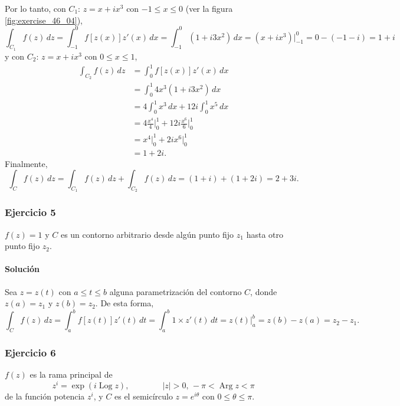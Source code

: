 \documentclass[a4paper]{report}
\DeclareMathOperator{\Arg}{Arg}
\DeclareMathOperator{\Log}{Log}
\begin{document}
Por lo tanto, con \(C_1:\,z=x+ix^3\) con \(-1\leq x\leq0\) (ver la figura \ref{fig:exercise_46_04}),
\[
 \int_{C_1}f(z)\,dz=\int_{-1}^{0}f[z(x)]z'(x)\,dx=\int_{-1}^{0}(1+i3x^2)\,dx=(x+ix^3)\bigg|_{-1}^{0}=0-(-1-i)=1+i
\]
y con \(C_2:\,z=x+ix^3\) con \(0\leq x\leq1\),
\begin{align*}
 \int_{C_2}f(z)\,dz&=\int_{0}^{1}f[z(x)]z'(x)\,dx\\
   &=\int_{0}^{1}4x^3(1+i3x^2)\,dx\\ 
   &=4\int_{0}^{1}x^3\,dx+12i\int_{0}^{1}x^5\,dx\\
   &=4\frac{x^4}{4}\bigg|_{0}^{1}+12i\frac{x^6}{6}\bigg|_{0}^{1}\\
   &=x^4\bigg|_{0}^{1}+2ix^6\bigg|_{0}^{1}\\
   &=1+2i.
\end{align*}
Finalmente,
\[
 \int_C f(z)\,dz=\int_{C_1}f(z)\,dz+\int_{C_2}f(z)\,dz=(1+i)+(1+2i)=2+3i.
\]

\subsubsection{Ejercicio 5}

\(f(z)=1\) y \(C\) es un contorno arbitrario desde algún punto fijo \(z_1\) hasta otro punto fijo \(z_2\).

\paragraph{Solución} Sea \(z=z(t)\) con \(a\leq t\leq b\) alguna parametrización del contorno \(C\), donde \(z(a)=z_1\) y \(z(b)=z_2\). De esta forma,
\[
 \int_Cf(z)\,dz=\int_a^bf[z(t)]z'(t)\,dt=\int_a^b1\times z'(t)\,dt=z(t)\bigg|_a^b=z(b)-z(a)=z_2-z_1.
\]

\subsubsection{Ejercicio 6}

\(f(z)\) es la rama principal de
\[
 z^i=\exp(i\Log z),
 \qquad\qquad
 |z|>0,\,-\pi<\Arg z<\pi
\]
de la función potencia \(z^i\), y \(C\) es el semicírculo \(z=e^{i\theta}\) con \(0\leq\theta\leq\pi\).
\end{document}
